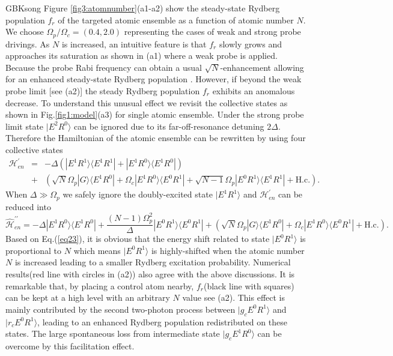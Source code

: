 \documentclass{cpbtex}
\begin{document}
\begin{CJK*}{GBK}{song}
Figure \ref{fig3:atomnumber}(a1-a2) show the steady-state Rydberg population $f_r$ of the targeted atomic ensemble as a function of atomic number $N$. 
We choose $\Omega_p/\Omega_c=(0.4,2.0)$ representing the cases of weak and strong probe drivings.
As $N$ is increased, an intuitive feature is that $f_r$ slowly grows and approaches its saturation as shown in (a1) where a weak probe is applied. Because the probe Rabi frequency can obtain a usual $\sqrt{N}$-enhancement allowing for an enhanced steady-state Rydberg population \cite{PhysRevA.91.043802}. However, if beyond the weak probe limit [see (a2)] the steady Rydberg population $f_r$ exhibits an anomalous decrease. 
To understand this unusual effect
we revisit the collective states as shown in Fig.\ref{fig1:model}(a3) for single atomic ensemble. Under the strong probe limit state $|E^2R^0\rangle$ can be ignored due to its far-off-resonance detuning $2\Delta$. Therefore the Hamiltonian of the atomic ensemble can be rewritten by using four collective states
\begin{eqnarray}
{\mathcal{H}}_{en}^\prime&=&-\Delta(|E^1R^1\rangle\langle E^1R^1|+|E^1R^0\rangle\langle E^1R^0|)\nonumber\\
&+&(\sqrt{N}\Omega_p|G\rangle\langle E^1R^0|+\Omega_c|E^1R^0\rangle\langle E^0R^1|+\sqrt{N-1}\Omega_p|E^0R^1\rangle\langle E^1R^1|+\text{H.c.}).
\label{eq22}
\end{eqnarray}
When $\Delta \gg \Omega_p$ we safely ignore the doubly-excited state $|E^1R^1\rangle$ and ${\mathcal{H}}_{en}^\prime$ can be reduced into
\begin{equation}
\hat{\mathcal{H}}_{en}^{\prime\prime}=-\Delta|E^1R^0\rangle\langle E^1R^0|+\frac{(N-1)\Omega_p^2}{\Delta}|E^0R^1\rangle\langle E^0R^1|
+(\sqrt{N}\Omega_p|G\rangle\langle E^1R^0|+\Omega_c|E^1R^0\rangle\langle E^0R^1|+\text{H.c.}).
\label{eq23}
\end{equation}
Based on Eq.(\ref{eq23}), it is obvious that the energy shift related to state $|E^0R^1\rangle$ is proportional to $ N$ which means $|E^0R^1\rangle$ is highly-shifted when the atomic number $N$ is increased leading to a smaller Rydberg excitation probability. Numerical results(red line with circles in (a2)) also agree with the above discussions.
It is remarkable that, by placing a control atom nearby, $f_r$(black line with squares) can be kept at a high level with an arbitrary $N$ value see (a2). This effect is mainly contributed by the second two-photon process between $|g_cE^0R^1\rangle$ and $|r_cE^0R^1\rangle$, leading to an enhanced Rydberg population redistributed on these states. The large spontaneous loss from intermediate state $|g_cE^1R^0\rangle$ can be overcome by this facilitation effect.



\end{CJK*}
\end{document}
